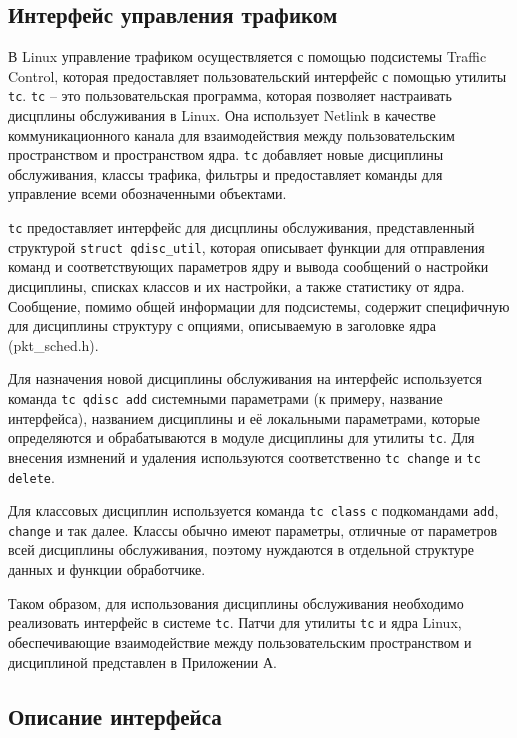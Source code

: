 	\subsection{Интерфейс управления трафиком}

	В Linux управление трафиком осуществляется с помощью подсистемы Traffic Control,
	которая предоставляет пользовательский интерфейс с помощью утилиты \texttt{tc}.
	\texttt{tc} -- это пользовательская программа, которая позволяет настраивать
	дисцплины обслуживания в Linux. Она использует Netlink в качестве
	коммуникационного канала для взаимодействия между пользовательским
	пространством и пространством ядра. \texttt{tc} добавляет новые дисциплины
	обслуживания, классы трафика, фильтры и предоставляет команды для
	управление всеми обозначенными объектами.\cite{tcpip}

	\texttt{tc} предоставляет интерфейс для дисцплины обслуживания,
	представленный структурой \lstinline{struct qdisc_util}, которая
	описывает функции для отправления команд и соответствующих параметров ядру
	и вывода сообщений о настройки дисциплины, списках классов и их настройки, а
	также статистику от ядра. Сообщение, помимо общей информации для подсистемы,
	содержит специфичную для дисциплины структуру с опциями, описываемую
	в заголовке ядра (pkt\_sched.h). 

	Для назначения новой дисциплины обслуживания на интерфейс используется
	команда \lstinline{tc qdisc add} системными параметрами (к примеру, название
	интерфейса), названием дисциплины и её локальными параметрами, которые
	определяются и обрабатываются в модуле дисциплины для утилиты \texttt{tc}. 
	Для внесения измнений и удаления используются соответственно \lstinline{tc change}
	и \lstinline{tc delete}.

	Для классовых дисциплин используется команда \lstinline{tc class} с подкомандами
	\lstinline{add}, \lstinline{change} и так далее. Классы обычно имеют параметры,
	отличные от параметров всей дисциплины обслуживания, поэтому нуждаются в отдельной
	структуре данных и функции обработчике.

	Таком образом, для использования дисциплины обслуживания необходимо
	реализовать интерфейс в системе \texttt{tc}. Патчи для утилиты \texttt{tc}
	и ядра Linux, обеспечивающие взаимодействие между пользовательским пространством
	и дисциплиной представлен в Приложении А. 

	\subsection{Описание интерфейса}

